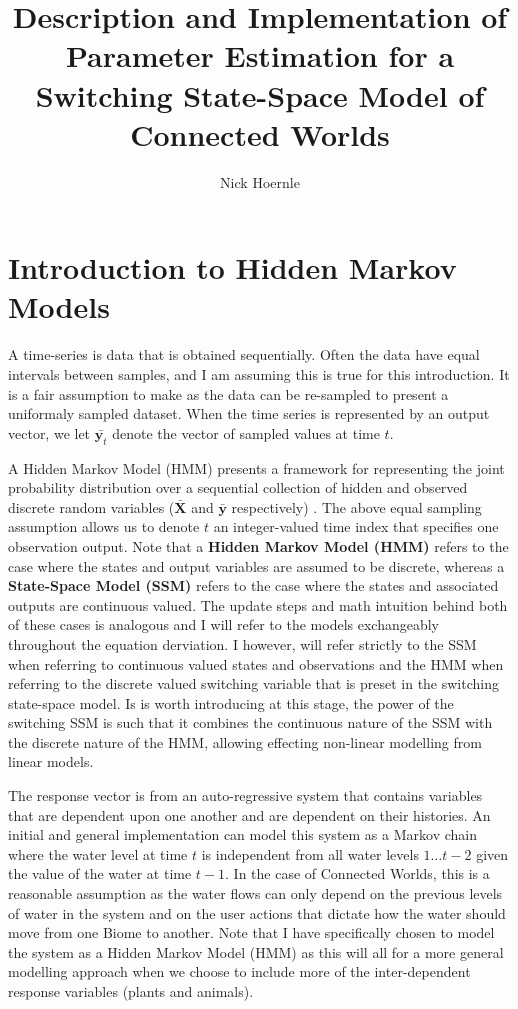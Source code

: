\documentclass{article}
\begin{document}
\author{Nick Hoernle}
\title{Description and Implementation of Parameter Estimation for a Switching State-Space Model of Connected Worlds}
\maketitle

\section{Introduction to Hidden Markov Models}
A time-series is data that is obtained sequentially. Often the data have equal intervals between samples, and I am assuming this is true for this introduction. It is a fair assumption to make as the data can be re-sampled to present a uniformaly sampled dataset. When the time series is represented by an output vector, we let $\bar{\mathbf{y}_t}$ denote the vector of sampled values at time $t$.

A Hidden Markov Model (HMM) presents a framework for representing the joint probability distribution over a sequential collection of hidden and observed discrete random variables ($\bar{\mathbf{X}}$ and $\bar{\mathbf{y}}$ respectively) \cite{ghahramani2001introduction}. The above equal sampling assumption allows us to denote $t$ an integer-valued time index that specifies one observation output. Note that a \textbf{Hidden Markov Model (HMM)} refers to the case where the states and output variables are assumed to be discrete, whereas a \textbf{State-Space Model (SSM)} refers to the case where the states and associated outputs are continuous valued. The update steps and math intuition behind both of these cases is analogous and I will refer to the models exchangeably throughout the equation derviation. I however, will refer strictly to the SSM when referring to continuous valued states and observations and the HMM when referring to the discrete valued switching variable that is preset in the switching state-space model. Is is worth introducing at this stage, the power of the switching SSM is such that it combines the continuous nature of the SSM with the discrete nature of the HMM, allowing effecting non-linear modelling from linear models.

The response vector is from an auto-regressive system that contains variables that are dependent upon one another and are dependent on their histories. An initial and general implementation can model this system as a Markov chain where the water level at time $t$ is independent from all water levels $1 \hdots t-2$ given the value of the water at time $t-1$. In the case of Connected Worlds, this is a reasonable assumption as the water flows can only depend on the previous levels of water in the system and on the user actions that dictate how the water should move from one Biome to another. Note that I have specifically chosen to model the system as a Hidden Markov Model (HMM) as this will all for a more general modelling approach when we choose to include more of the inter-dependent response variables (plants and animals).
\end{document}
